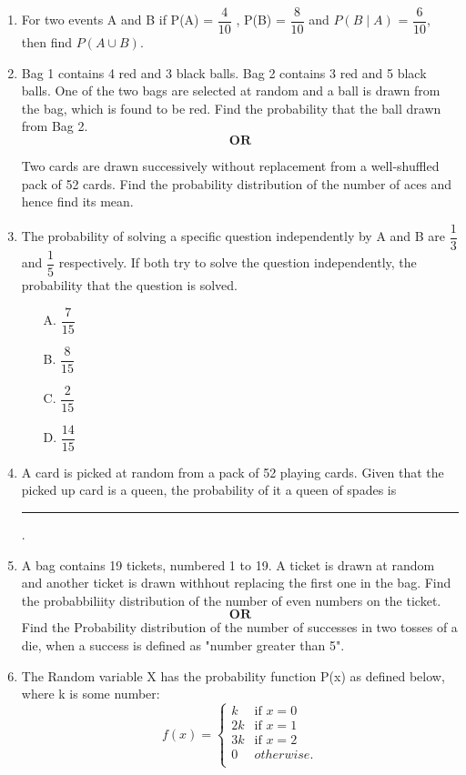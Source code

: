\documentclass[a4paper,12pt]{article}
\begin{document}
\begin{enumerate}
\item For two events A and B if P(A) = $\dfrac{4}{10}$ , P(B) = $\dfrac{8}{10}$ and $P(B\mid A)$ = $\dfrac{6}{10}$, then find $P(A \cup B)$.

\item Bag 1 contains 4 red and 3 black balls. Bag 2 contains 3 red and 5 black balls. One of the two bags are  selected at random and a ball is drawn from the bag, which is found to be red. Find the probability that the ball drawn from Bag 2.
$$ \textbf{OR} $$

Two cards are drawn successively without replacement from a well-shuffled pack of 52 cards. Find the probability distribution of the number of aces and hence find its mean.

\item The probability of solving a specific question independently by A and B are $\dfrac{1}{3}$ and $\dfrac{1}{5}$ respectively. If both try to solve the question independently, the probability that the question is solved. 
\begin{enumerate}
\item[A.] $\dfrac{7}{15}$\\
\item [B.]$\dfrac{8}{15}$\\
\item [C.]$\dfrac{2}{15}$\\
\item [D.]$\dfrac{14}{15}$\\
\end{enumerate}

\item A card is picked at random from a pack of 52 playing cards. Given that the picked up card is a queen, the probability of it a queen of spades is \rule{2cm}{0.15mm}.

\item A bag contains 19 tickets, numbered 1 to 19. A ticket is drawn at random and another ticket is drawn withhout replacing the first one in the bag. Find the probabbiliity distribution of the number of even numbers on the ticket.
$$ \textbf{OR} $$
Find the Probability distribution of the number of successes in two tosses of a die, when a success is defined as "number greater than 5".

\item The Random variable X has the probability function P(x) as defined below, where k is some number:\\

\[
f(x) = \left\{
\begin{array}{ll}
  k & \text{if } x = 0 \\
  2k & \text{if } x = 1\\
  3k & \text{if } x = 2\\
  0 & otherwise.\\
\end{array}
\right.
\]


\end{enumerate}
\end{document}
